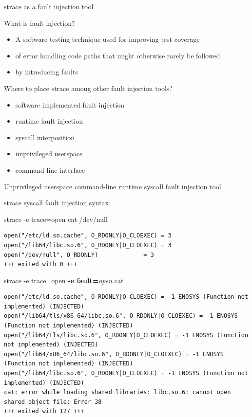 \documentclass[unicode,aspectratio=169]{beamer}
\begin{document}
\begin{frame}{strace as a fault injection tool}
\begin{block}{\large What is fault injection?}
	\begin{itemize}
	\item A software testing technique used for improving test coverage
	\item of error handling code paths that might otherwise rarely be followed
	\item by introducing faults
	\end{itemize}
\end{block}
\begin{block}{\large Where to place strace among other fault injection tools?}
	\begin{itemize}
		\item software implemented fault injection
		\item runtime fault injection
		\item syscall interposition
		\item unprivileged userspace
		\item command-line interface
	\end{itemize}
	Unprivileged userspace command-line runtime syscall fault injection tool
\end{block}
\end{frame}

\begin{frame}[fragile]{strace syscall fault injection syntax}
\scriptsize
\begin{block}{\large strace -e trace=open cat /dev/null}
\begin{verbatim}
open("/etc/ld.so.cache", O_RDONLY|O_CLOEXEC) = 3
open("/lib64/libc.so.6", O_RDONLY|O_CLOEXEC) = 3
open("/dev/null", O_RDONLY)             = 3
+++ exited with 0 +++
\end{verbatim}
\end{block}
\begin{block}{\large strace -e trace=open {\bf -e fault=}{\it open} cat}
\begin{verbatim}
open("/etc/ld.so.cache", O_RDONLY|O_CLOEXEC) = -1 ENOSYS (Function not implemented) (INJECTED)
open("/lib64/tls/x86_64/libc.so.6", O_RDONLY|O_CLOEXEC) = -1 ENOSYS (Function not implemented) (INJECTED)
open("/lib64/tls/libc.so.6", O_RDONLY|O_CLOEXEC) = -1 ENOSYS (Function not implemented) (INJECTED)
open("/lib64/x86_64/libc.so.6", O_RDONLY|O_CLOEXEC) = -1 ENOSYS (Function not implemented) (INJECTED)
open("/lib64/libc.so.6", O_RDONLY|O_CLOEXEC) = -1 ENOSYS (Function not implemented) (INJECTED)
cat: error while loading shared libraries: libc.so.6: cannot open shared object file: Error 38
+++ exited with 127 +++
\end{verbatim}
\end{block}
\end{frame}
\end{document}
